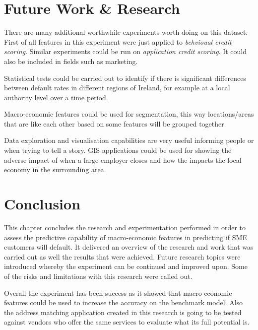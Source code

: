 \section{Future Work \& Research}

There are many additional worthwhile experiments worth doing on this dataset. First of all features in this experiment were just applied to \textit{behvioual credit scoring}. Similar experiments could be run on \textit{application credit scoring}. It could also be included in fields such as marketing.

Statistical tests could be carried out to identify if there is significant differences between default rates in different regions of Ireland, for example at a local authority level over a time period. 

Macro-economic features could be used for segmentation, this way locations/areas that are like each other based on some features will be grouped together

Data exploration and visualisation capabilities are very useful informing people or when trying to tell a story. GIS applications could be used for showing the adverse impact of when a large employer closes and how the impacts the local economy in the surrounding area.
\section{Conclusion}
This chapter concludes the research and experimentation performed in order to assess the predictive capability of macro-economic features in predicting if SME customers will default. It delivered an overview of the research and work that was carried out as well the results that were achieved. Future research topics were introduced whereby the experiment can be continued and improved upon. Some of the risks and limitations with this research were called out.

Overall the experiment has been success as it showed that macro-economic features could be used to increase the accuracy on the benchmark model. Also the address matching application created in this research is going to be tested against vendors who offer the same services to evaluate what its full potential is.









